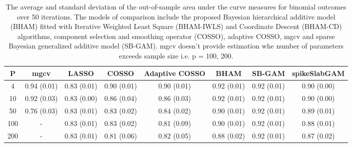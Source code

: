 \begin{table}[ht]
\centering
\begin{tabular}{cccccccc}
  \hline
P & mgcv & LASSO & COSSO & Adaptive COSSO & BHAM & SB-GAM & spikeSlabGAM \\ 
  \hline
  4 & 0.94 (0.01) & 0.83 (0.01) & 0.90 (0.01) & 0.90 (0.01) & 0.92 (0.01) & 0.92 (0.01) & 0.90 (0.00) \\ 
   10 & 0.92 (0.03) & 0.83 (0.00) & 0.86 (0.04) & 0.86 (0.03) & 0.92 (0.01) & 0.92 (0.01) & 0.90 (0.00) \\ 
   50 & 0.76 (0.03) & 0.83 (0.01) & 0.83 (0.02) & 0.84 (0.02) & 0.90 (0.01) & 0.92 (0.01) & 0.89 (0.01) \\ 
  100 & - & 0.83 (0.01) & 0.83 (0.02) & 0.81 (0.09) & 0.90 (0.01) & 0.92 (0.01) & 0.88 (0.01) \\ 
  200 & - & 0.83 (0.01) & 0.81 (0.06) & 0.82 (0.05) & 0.88 (0.02) & 0.92 (0.01) & 0.87 (0.02) \\ 
   \hline
\end{tabular}
\caption{The average and standard deviation of the out-of-sample area under the curve measures
    for binomial outcomes over 50 iterations. The models of comparison include the proposed Bayesian
    hierarchical additive model (BHAM) fitted with Iterative Weighted Least Square (BHAM-IWLS) and
    Coordinate Descent (BHAM-CD) algorithms, component selection and smoothing operator (COSSO),
    adaptive COSSO, mgcv and sparse Bayesian generalized additive model (SB-GAM). mgcv doesn't provide
    estimation whe number of parameters exceeds sample size i.e. p = 100, 200.} 
\label{tab:bin_auc}
\end{table}
